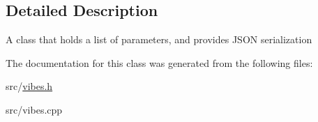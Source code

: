 \subsection{Detailed Description}
A class that holds a list of parameters, and provides J\+S\+ON serialization 

The documentation for this class was generated from the following files\+:\begin{DoxyCompactItemize}
\item 
src/\hyperlink{vibes_8h}{vibes.\+h}\item 
src/vibes.\+cpp\end{DoxyCompactItemize}

